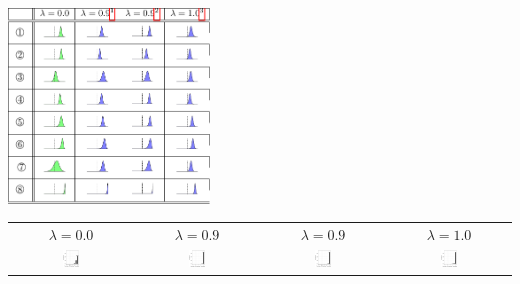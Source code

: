 \documentclass[10pt,twoside,lineno]{article}
\begin{document}
\begin{table}[hbt!]
	\begin{center}
\includegraphics[width=0.4\textwidth]{si-table-perrel-3-1.png}  
	\end{center}

	\begin{center}
\begin{tabular}{cccc}
$\lambda=0.0$ & $\lambda=0.9$ & $\lambda=0.9$ & $\lambda=1.0$ \\
	\includegraphics[width=0.15\textwidth]{../results/correlations/figures/posterior-satisfied-universals-parseability.pdf}&
	\includegraphics[width=0.15\textwidth]{../results/correlations/figures/posterior-satisfied-universals-together-large-prior-efficiency09.pdf}&
	\includegraphics[width=0.15\textwidth]{../results/correlations/figures/posterior-satisfied-universals-efficiency-large.pdf}&
	\includegraphics[width=0.15\textwidth]{../results/correlations/figures/posterior-satisfied-universals-together-large-prior-efficiency10.pdf}
\end{tabular}
	\end{center}


\end{table}
\end{document}
